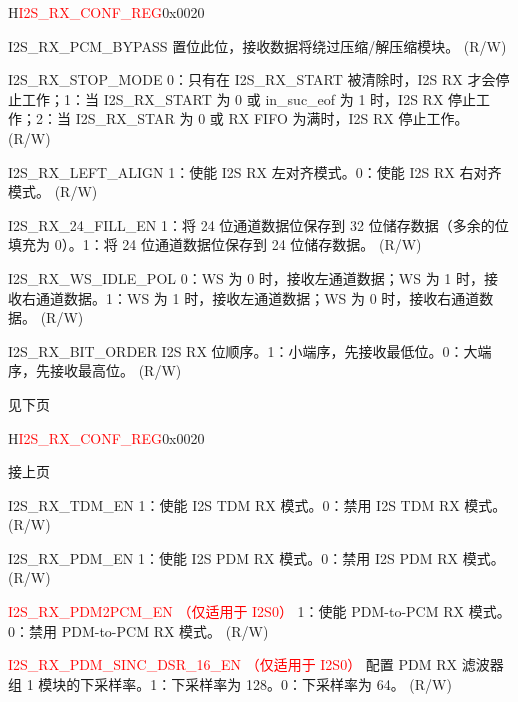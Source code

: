 \begin{register}{H}{\textcolor{red}{I2S\_RX\_CONF\_REG}}{0x{}0020}
\begin{regdesc}
\begin{reglist}
\label{fielddesc:I2SRXPCMBYPASS}\item [I2S\_RX\_PCM\_BYPASS] 置位此位，接收数据将绕过压缩/解压缩模块。 (R/W)
\label{fielddesc:I2SRXSTOPMODE}\item [I2S\_RX\_STOP\_MODE] 0：只有在 I2S\_RX\_START 被清除时，I2S RX 才会停止工作；1：当 I2S\_RX\_START 为 0 或 in\_suc\_eof 为 1 时，I2S RX 停止工作；2：当 I2S\_RX\_STAR 为 0 或 RX FIFO 为满时，I2S RX 停止工作。 (R/W)
\label{fielddesc:I2SRXLEFTALIGN}\item [I2S\_RX\_LEFT\_ALIGN] 1：使能 I2S RX 左对齐模式。0：使能 I2S RX 右对齐模式。 (R/W)
\label{fielddesc:I2SRX24FILLEN}\item [I2S\_RX\_24\_FILL\_EN] 1：将 24 位通道数据位保存到 32 位储存数据（多余的位填充为 0）。1：将 24 位通道数据位保存到 24 位储存数据。 (R/W)
\label{fielddesc:I2SRXWSIDLEPOL}\item [I2S\_RX\_WS\_IDLE\_POL] 0：WS 为 0 时，接收左通道数据；WS 为 1 时，接收右通道数据。1：WS 为 1 时，接收左通道数据；WS 为 0 时，接收右通道数据。 (R/W)
\label{fielddesc:I2SRXBITORDER}\item [I2S\_RX\_BIT\_ORDER] I2S RX 位顺序。1：小端序，先接收最低位。0：大端序，先接收最高位。 (R/W)
\item [见下页]
\end{reglist}\end{regdesc}
\end{register}

\addtocounter{Regfloat}{-1}
\begin{register}{H}{\textcolor{red}{I2S\_RX\_CONF\_REG}}{0x{}0020}
\begin{regdesc}\begin{reglist}
\item [接上页]
\label{fielddesc:I2SRXTDMEN}\item [I2S\_RX\_TDM\_EN] 1：使能 I2S TDM RX 模式。0：禁用 I2S TDM RX 模式。 (R/W)
\label{fielddesc:I2SRXPDMEN}\item [I2S\_RX\_PDM\_EN] 1：使能 I2S PDM RX 模式。0：禁用 I2S PDM RX 模式。 (R/W)
\label{fielddesc:I2SRXPDM2PCMEN}\item [\textcolor{red}{I2S\_RX\_PDM2PCM\_EN （仅适用于 I2S0）}] 1：使能 PDM-to-PCM RX 模式。0：禁用 PDM-to-PCM RX 模式。 (R/W)
\label{fielddesc:I2SRXPDMSINCDSR16EN}\item [\textcolor{red}{I2S\_RX\_PDM\_SINC\_DSR\_16\_EN （仅适用于 I2S0）}] 配置 PDM RX 滤波器组 1 模块的下采样率。1：下采样率为 128。0：下采样率为 64。 (R/W)
\end{reglist}\end{regdesc}
\end{register}


